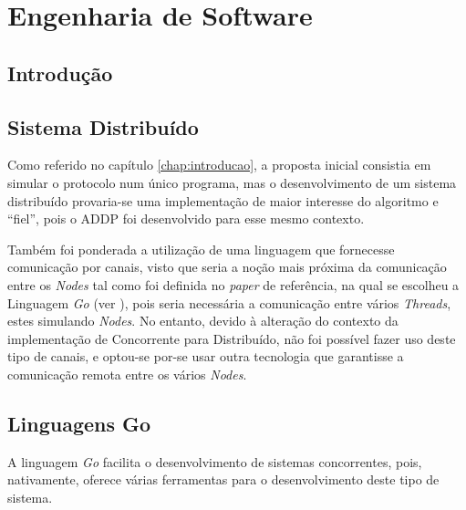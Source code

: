 \chapter{Engenharia de Software}
\label{chap:engenharia}

\section{Introdução}
\label{engenharia:sec:introducao}

\section{Sistema Distribuído}
\label{engenharia:sec:sistema}
\begin{comment}
- Inicialmente Concorrente
- O Algoritmo foi definido para sistemas distribuídos
- Mais interessante e abrange os dois temas ao mesmo tempo
- Não se fez uso dos canais do Go, mas fez-se uso de ligações HTTP
\end{comment}

Como referido no capítulo \ref{chap:introducao}, a proposta inicial consistia em simular o protocolo num único programa,
mas o desenvolvimento de um sistema distribuído 
provaria-se uma implementação de maior interesse do algoritmo e ``fiel'', pois o \acs*{ADDP} foi desenvolvido para esse mesmo contexto.

Também foi ponderada a utilização de uma linguagem que fornecesse comunicação por canais,
visto que seria a noção mais próxima da comunicação entre os \emph{Nodes} tal como foi definida no \emph{paper} de referência, na qual se
escolheu a Linguagem \emph{Go} (ver \label{implementacao:subsec:go}), pois seria necessária a comunicação entre vários \emph{Threads}, estes simulando \emph{Nodes}.
No entanto, devido à alteração do contexto da implementação de Concorrente para Distribuído, não foi possível fazer uso deste tipo de canais, 
e optou-se por-se usar outra tecnologia que garantisse a comunicação remota entre os vários \emph{Nodes}.




\section{Linguagens Go}
\label{engenharia:sec:go}


A linguagem \emph{Go} facilita o desenvolvimento de sistemas concorrentes, pois, nativamente, oferece várias ferramentas para o desenvolvimento deste tipo de sistema.


